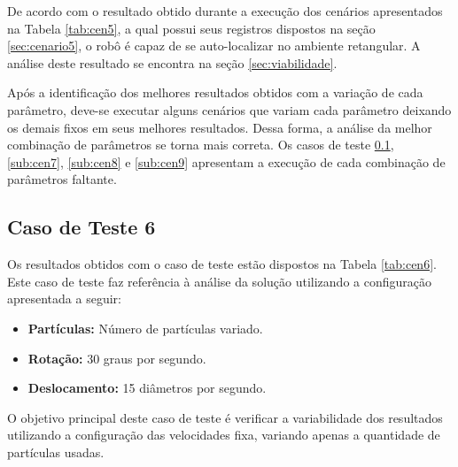 De acordo com o resultado obtido durante a execução dos cenários apresentados na Tabela \ref{tab:cen5}, a qual possui seus registros
dispostos na seção \ref{sec:cenario5}, o robô é capaz de se auto-localizar no ambiente retangular. A análise deste resultado se encontra
na seção \ref{sec:viabilidade}.

Após a identificação dos melhores resultados obtidos com a variação de cada parâmetro, deve-se executar alguns cenários que variam
cada parâmetro deixando os demais fixos em seus melhores resultados. Dessa forma, a análise da melhor combinação de parâmetros se torna
mais correta. Os casos de teste \ref{sub:cen6}, \ref{sub:cen7}, \ref{sub:cen8} e \ref{sub:cen9} apresentam a execução de cada combinação
de parâmetros faltante.

\subsection{Caso de Teste 6}
\label{sub:cen6}

Os resultados obtidos com o caso de teste estão dispostos na Tabela \ref{tab:cen6}. Este caso de teste faz referência à análise da solução
utilizando a configuração apresentada a seguir:

\begin{itemize}
  \item \textbf{Partículas:} Número de partículas variado.
  \item \textbf{Rotação:} 30 graus por segundo.
  \item \textbf{Deslocamento:} 15 diâmetros por segundo.
\end{itemize}

O objetivo principal deste caso de teste é verificar a variabilidade dos resultados utilizando a configuração das velocidades fixa, variando
apenas a quantidade de partículas usadas.

